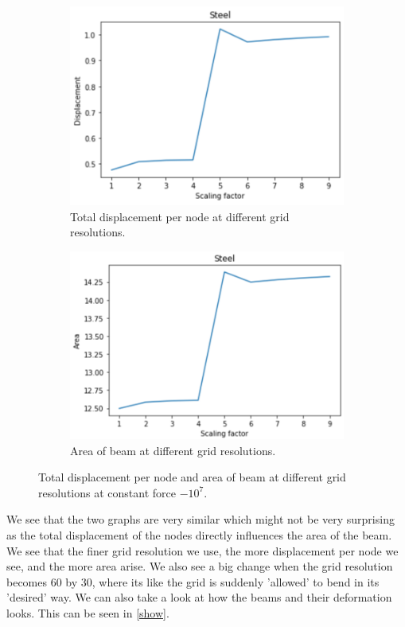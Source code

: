  \begin{figure}[H]
 	\centering
 	\begin{subfigure}[b]{0.49\linewidth}
 		\centering
 		\includegraphics[width=\linewidth]{Materials/Displacement}
 		\caption{Total displacement per node at different grid resolutions.}
 	\end{subfigure}
 	\hfill
 	\begin{subfigure}[b]{0.49\linewidth}
 		\centering
 		\includegraphics[width=\linewidth]{Materials/Area}
 		\caption{Area of beam at different grid resolutions.}
 	\end{subfigure}
 	\caption{Total displacement per node and area of beam at different grid resolutions at constant force $-10^7$.}
 	\label{measures}
 \end{figure}
We see that the two graphs are very similar which might not be very surprising as the total displacement of the nodes directly influences the area of the beam. We see that the finer grid resolution we use, the more displacement per node we see, and the more area arise. We also see a big change when the grid resolution becomes 60 by 30, where its like the grid is suddenly 'allowed' to bend in its 'desired' way. We can also take a look at how the beams and their deformation looks. This can be seen in \autoref{show}.
